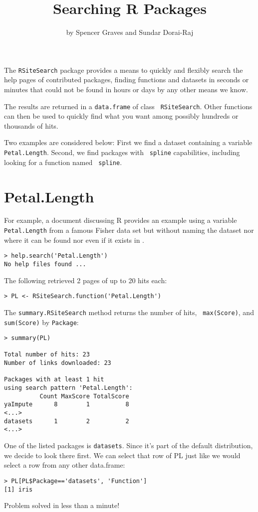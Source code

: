 \title{Searching R Packages} 
\author{by Spencer Graves and Sundar Dorai-Raj}

\maketitle

The {\tt RSiteSearch} package provides a means to quickly and
flexibly search the help pages of contributed packages, finding
functions and datasets in seconds or minutes that could not be
found in hours or days by any other means we know.

The results are returned in a {\tt data.frame} of class {\tt
RSiteSearch}.  Other \R{} functions can then be used to quickly find
what you want among possibly hundreds or thousands of hits.

Two examples are considered below:  First we find a dataset containing
a variable {\tt Petal.Length}.  Second, we find packages with {\tt
  spline} capabilities, including looking for a function named {\tt
  spline}.

\section*{Petal.Length}

For example, a document discussing R provides an example using a
variable {\tt Petal.Length} from a famous Fisher data set but without
naming the dataset nor where it can be found nor even if it exists in
\R{}.
\begin{verbatim}
> help.search('Petal.Length')
No help files found ...
\end{verbatim}
The following retrieved 2 pages of up to 20 hits each:
\begin{verbatim}
> PL <- RSiteSearch.function('Petal.Length')
\end{verbatim}
The {\tt summary.RSiteSearch} method returns the number of hits, {\tt
max(Score)}, and {\tt sum(Score)} by {\tt Package}:
\begin{verbatim}
> summary(PL)

Total number of hits: 23
Number of links downloaded: 23

Packages with at least 1 hit
using search pattern 'Petal.Length':
          Count MaxScore TotalScore
yaImpute      8        1          8
<...>
datasets      1        2          2
<...>
\end{verbatim}
One of the listed packages is {\tt datasets}.  Since it's part of the
default \R{} distribution, we decide to look there first.  We can
select that row of PL just like we would select a row from any other
data.frame:
\begin{verbatim}
> PL[PL$Package=='datasets', 'Function']
[1] iris
\end{verbatim}
Problem solved in less than a minute!

